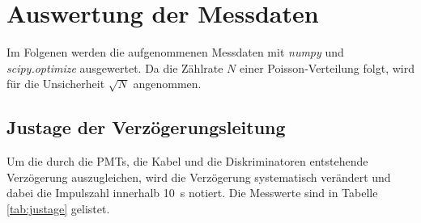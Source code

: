 \section{Auswertung der Messdaten}
\label{sec:Auswertung}
Im Folgenen werden die aufgenommenen Messdaten mit \textit{numpy} und \textit{scipy.optimize} ausgewertet. Da die Zählrate $N$ einer Poisson-Verteilung folgt, wird
für die Unsicherheit $\sqrt{N}$ angenommen. 

\subsection{Justage der Verzögerungsleitung}
\label{sec:justage}
Um die durch die PMTs, die Kabel und die Diskriminatoren entstehende Verzögerung auszugleichen, wird die Verzögerung systematisch verändert und dabei die Impulszahl innerhalb \SI{10}{\second} 
notiert. Die Messwerte sind in Tabelle \ref{tab:justage} gelistet. 

